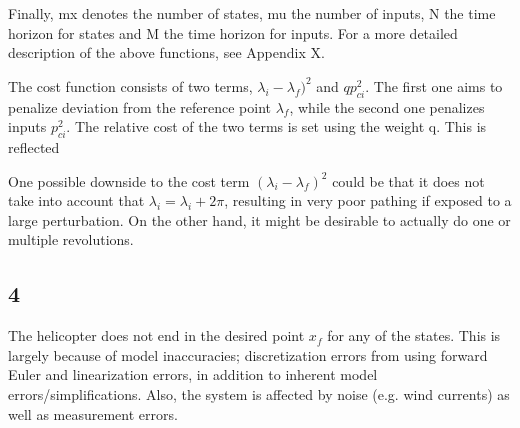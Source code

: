 Finally, mx denotes the number of states, mu the number of inputs, N the time horizon for states and M the time horizon for inputs. For a more detailed description of the above functions, see Appendix X. 

The cost function  consists of two terms, $\lambda_i - \lambda_f)^2$ and $qp_{ci}^2$. The first one aims to penalize deviation from the reference point $\lambda_f$, while the second one penalizes inputs $p_{ci}^2$. The relative cost of the two terms is set using the weight q. This is reflected 

One possible downside to the cost term $(\lambda_i - \lambda_f)^2$ could be that it does not take into account that $\lambda_i = \lambda_ i + 2\pi$, resulting in very poor pathing if exposed to a large perturbation. On the other hand, it might be desirable to actually do one or multiple revolutions.

\subsection{4}
The helicopter does not end in the desired point $x_f$ for any of the states. This is largely  because of model inaccuracies; discretization errors from using forward Euler and linearization errors, in addition to inherent model errors/simplifications. Also, the system is affected by noise (e.g. wind currents) as well as measurement errors.
